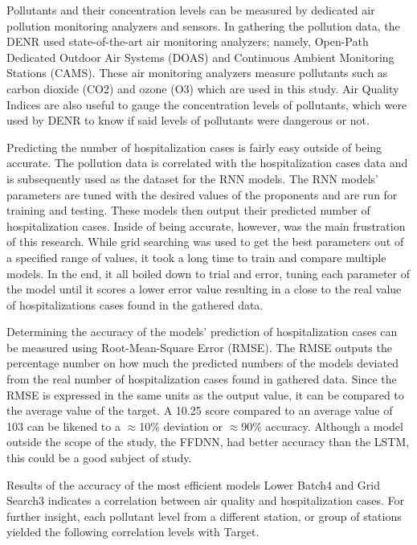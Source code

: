 \documentclass[10pt,11pt,12pt,oneside]{book}
\begin{document}
Pollutants and their concentration levels can be measured by dedicated air pollution monitoring analyzers and sensors. In gathering the pollution data, the DENR used state-of-the-art air monitoring analyzers; namely, Open-Path Dedicated Outdoor Air Systems (DOAS) and Continuous Ambient Monitoring Stations (CAMS). These air monitoring analyzers measure pollutants such as carbon dioxide (CO2) and ozone (O3) which are used in this study. Air Quality Indices are also useful to gauge the concentration levels of pollutants, which were used by DENR to know if said levels of pollutants were dangerous or not.

Predicting the number of hospitalization cases is fairly easy outside of being accurate. The pollution data is correlated with the hospitalization cases data and is subsequently used as the dataset for the RNN models. The RNN models' parameters are tuned with the desired values of the proponents and are run for training and testing. These models then output their predicted number of hospitalization cases. Inside of being accurate, however, was the main frustration of this research. While grid searching was used to get the best parameters out of a specified range of values, it took a long time to train and compare multiple models. In the end, it all boiled down to trial and error, tuning each parameter of the model until it scores a lower error value resulting in a close to the real value of hospitalizations cases found in the gathered data. 

Determining the accuracy of the models' prediction of hospitalization cases can be measured using Root-Mean-Square Error (RMSE). The RMSE outputs the percentage number on how much the predicted numbers of the models deviated from the real number of hospitalization cases found in gathered data. Since the RMSE is expressed in the same units as the output value, it can be compared to the average value of the target. A 10.25 score compared to an average value of 103 can be likened to a $\approx$10\% deviation or $\approx$90\% accuracy. Although a model outside the scope of the study, the FFDNN, had better accuracy than the LSTM, this could be a good subject of study.


Results of the accuracy of the most efficient models Lower Batch4 and Grid Search3 indicates a correlation between air quality and hospitalization cases. For further insight, each pollutant level from a different station, or group of stations yielded the following correlation levels with Target.
\end{document}

